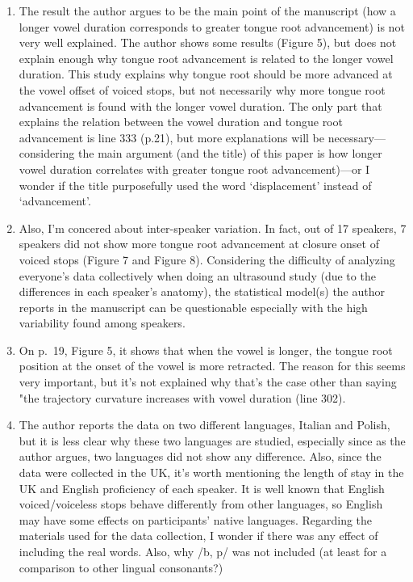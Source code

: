 \documentclass[]{article}
\begin{document}
\begin{enumerate}
\def\labelenumi{\arabic{enumi}.}
\item
  The result the author argues to be the main point of the manuscript
  (how a longer vowel duration corresponds to greater tongue root
  advancement) is not very well explained. The author shows some results
  (Figure 5), but does not explain enough why tongue root advancement is
  related to the longer vowel duration. This study explains why tongue
  root should be more advanced at the vowel offset of voiced stops, but
  not necessarily why more tongue root advancement is found with the
  longer vowel duration. The only part that explains the relation
  between the vowel duration and tongue root advancement is line 333
  (p.21), but more explanations will be necessary---considering the main
  argument (and the title) of this paper is how longer vowel duration
  correlates with greater tongue root advancement)---or I wonder if the
  title purposefully used the word `displacement' instead of
  `advancement'.
\item
  Also, I'm concered about inter-speaker variation. In fact, out of 17
  speakers, 7 speakers did not show more tongue root advancement at
  closure onset of voiced stops (Figure 7 and Figure 8). Considering the
  difficulty of analyzing everyone's data collectively when doing an
  ultrasound study (due to the differences in each speaker's anatomy),
  the statistical model(s) the author reports in the manuscript can be
  questionable especially with the high variability found among
  speakers.
\item
  On p.~19, Figure 5, it shows that when the vowel is longer, the tongue
  root position at the onset of the vowel is more retracted. The reason
  for this seems very important, but it's not explained why that's the
  case other than saying "the trajectory curvature increases with vowel
  duration (line 302).
\item
  The author reports the data on two different languages, Italian and
  Polish, but it is less clear why these two languages are studied,
  especially since as the author argues, two languages did not show any
  difference. Also, since the data were collected in the UK, it's worth
  mentioning the length of stay in the UK and English proficiency of
  each speaker. It is well known that English voiced/voiceless stops
  behave differently from other languages, so English may have some
  effects on participants' native languages. Regarding the materials
  used for the data collection, I wonder if there was any effect of
  including the real words. Also, why /b, p/ was not included (at least
  for a comparison to other lingual consonants?)
\end{enumerate}
\end{document}
